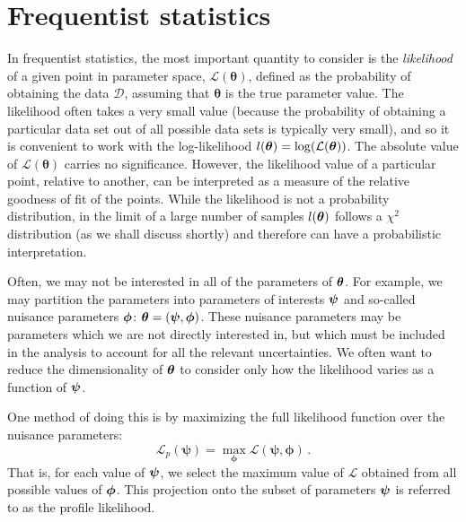 

\section{Frequentist statistics}


In frequentist statistics, the most important quantity to consider is the \textit{likelihood} of a given point in parameter space, $\mathcal{L}(\boldsymbol\theta)$, defined as the probability of obtaining the data $\mathcal{D}$, assuming that $\boldsymbol\theta$ is the true parameter value. The likelihood often takes a very small value (because the probability of obtaining a particular data set out of all possible data sets is typically very small), and so it is convenient to work with the log-likelihood $l(\boldsymbol\theta) = \log(\mathcal{L}(\boldsymbol\theta))$. The absolute value of $\mathcal{L}(\boldsymbol\theta)$ carries no significance. However, the likelihood value of a particular point, relative to another, can be interpreted as a measure of the relative goodness of fit of the points. While the likelihood is not a probability distribution, in the limit of a large number of samples $l(\boldsymbol\theta)$ follows a $\chi^2$ distribution (as we shall discuss shortly) and therefore can have a probabilistic interpretation.

Often, we may not be interested in all of the parameters of $\boldsymbol\theta$. For example, we may partition the parameters into parameters of interests $\boldsymbol\psi$ and so-called nuisance parameters $\boldsymbol\phi$: $\boldsymbol\theta = (\boldsymbol\psi, \boldsymbol\phi)$. These nuisance parameters may be parameters which we are not directly interested in, but which must be included in the analysis to account for all the relevant uncertainties. We often want to reduce the dimensionality of $\boldsymbol\theta$ to consider only how the likelihood varies as a function of $\boldsymbol\psi$. 

One method of doing this is by maximizing the full likelihood function over the nuisance parameters:
\begin{equation}
\label{eq:parameter:profilelikelihood}
\mathcal{L}_p(\boldsymbol{\psi}) = \max_{\boldsymbol{\phi}} \mathcal{L}(\boldsymbol{\psi},\boldsymbol{\phi})\,.
\end{equation}
That is, for each value of $\boldsymbol\psi$, we select the maximum value of $\mathcal{L}$ obtained from all possible values of $\boldsymbol\phi$. This projection onto the subset of parameters $\boldsymbol\psi$ is referred to as the profile likelihood.

